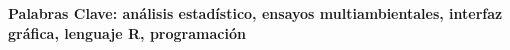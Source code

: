 \textbf{Palabras Clave: análisis estadístico, ensayos multiambientales, interfaz gráfica, lenguaje R, programación}

